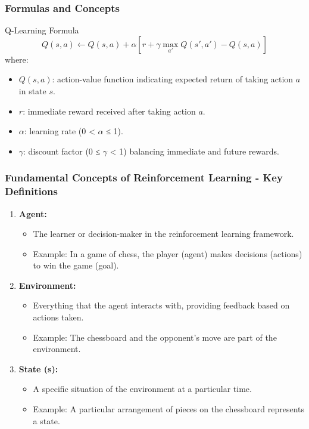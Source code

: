 \documentclass[aspectratio=169]{beamer}
\begin{document}
\begin{frame}[fragile]
    \frametitle{Formulas and Concepts}
    \begin{block}{Q-Learning Formula}
        \begin{equation}
            Q(s, a) \leftarrow Q(s, a) + \alpha \left[ r + \gamma \max_{a'} Q(s', a') - Q(s, a) \right]
        \end{equation}
        where:
        \begin{itemize}
            \item \( Q(s, a) \): action-value function indicating expected return of taking action \( a \) in state \( s \).
            \item \( r \): immediate reward received after taking action \( a \).
            \item \( \alpha \): learning rate (0 < \( \alpha \) ≤ 1).
            \item \( \gamma \): discount factor (0 ≤ \( \gamma \) < 1) balancing immediate and future rewards.
        \end{itemize}
    \end{block}
\end{frame}

\begin{frame}[fragile]
    \frametitle{Fundamental Concepts of Reinforcement Learning - Key Definitions}
    \begin{enumerate}
        \item \textbf{Agent:}
        \begin{itemize}
            \item The learner or decision-maker in the reinforcement learning framework. 
            \item Example: In a game of chess, the player (agent) makes decisions (actions) to win the game (goal).
        \end{itemize}

        \item \textbf{Environment:}
        \begin{itemize}
            \item Everything that the agent interacts with, providing feedback based on actions taken.
            \item Example: The chessboard and the opponent's move are part of the environment. 
        \end{itemize}

        \item \textbf{State (s):}
        \begin{itemize}
            \item A specific situation of the environment at a particular time.
            \item Example: A particular arrangement of pieces on the chessboard represents a state.
        \end{itemize}
    \end{enumerate}
\end{frame}
\end{document}
